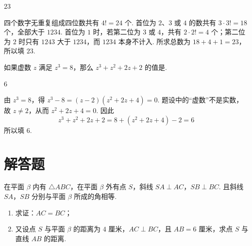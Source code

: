 \documentclass[UTF8,a4paper,oneside,11pt]{ctexbook}
\begin{document}
\begin{answer}
\(23\)
\end{answer}

\begin{solution}
四个数字无重复组成四位数共有 \(4!=24\) 个. 首位为 \(2\)、\(3\) 或 \(4\) 的数共有 \(3\cdot3!=18\) 个，全部大于 \(1234\). 首位为 \(1\) 时，若第二位为 \(3\) 或 \(4\)，共有 \(2\cdot2!=4\) 个；第二位为 \(2\) 时只有 \(1243\) 大于 \(1234\)，而 \(1234\) 本身不计入. 所求总数为 \(18+4+1=23\)，所以填 \(23\).
\end{solution}

\begin{problem}
如果虚数 \(z\) 满足 \(z^3=8\)，那么 \(z^3+z^2+2z+2\) 的值是\fillinblank{}.
\end{problem}

\begin{answer}
\(6\)
\end{answer}

\begin{solution}
由 \(z^3=8\)，得
\(z^3-8=(z-2)(z^2+2z+4)=0\). 题设中的“虚数”不是实数，故 \(z\neq2\)，从而 \(z^2+2z+4=0\). 因此
\[
z^3+z^2+2z+2
=8+(z^2+2z+4)-2
=6
\]
所以填 \(6\).
\end{solution}

\section{解答题}

\begin{problem}
在平面 \(\beta\) 内有 \(\triangle ABC\)，在平面 \(\beta\) 外有点 \(S\)，斜线 \(SA\perp AC\)，\(SB\perp BC\). 且斜线 \(SA\)，\(SB\) 分别与平面 \(\beta\) 所成的角相等.

\begin{enumerate}
\item 求证：\(AC=BC\)；
\item 又设点 \(S\) 与平面 \(\beta\) 的距离为 \(4\text{ 厘米}\)，\(AC\perp BC\)，且 \(AB=6\text{ 厘米}\)，求点 \(S\) 与直线 \(AB\) 的距离.
\end{enumerate}
\end{problem}
\end{document}

